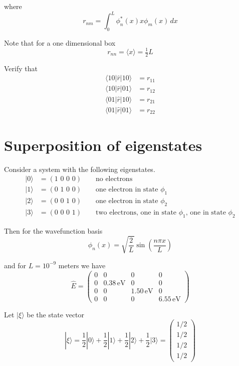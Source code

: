 \documentclass[12pt]{article}
\begin{document}
\noindent
where
\begin{equation*}
r_{nm}=\int_0^L\phi_n^*(x)x\phi_m(x)\,dx
\end{equation*}

\noindent
Note that for a one dimensional box
\begin{equation*}
r_{nn}=\langle x\rangle=\tfrac{1}{2}L
\end{equation*}

\noindent
Verify that
\begin{align*}
\langle10|\hat{r}|10\rangle&=r_{11}\\
\langle10|\hat{r}|01\rangle&=r_{12}\\
\langle01|\hat{r}|10\rangle&=r_{21}\\
\langle01|\hat{r}|01\rangle&=r_{22}
\end{align*}

\newpage

\section{Superposition of eigenstates}
Consider a system with the following eigenstates.
\begin{align*}
|0\rangle&=(\text{1 0 0 0})\qquad\text{no electrons}\\
|1\rangle&=(\text{0 1 0 0})\qquad\text{one electron in state $\phi_1$}\\
|2\rangle&=(\text{0 0 1 0})\qquad\text{one electron in state $\phi_2$}\\
|3\rangle&=(\text{0 0 0 1})\qquad\text{two electrons, one in state $\phi_1$, one in state $\phi_2$}
\end{align*}

\noindent
Then for the wavefunction basis
\begin{equation*}
\phi_n(x)=\sqrt{\frac{2}{L}}\sin\left(\frac{n\pi x}{L}\right)
\end{equation*}

\noindent
and for $L=10^{-9}$ meters we have
\begin{equation*}
\hat{E}=\begin{pmatrix}
0&0&0&0\\
0&0.38\,\text{eV}&0&0\\
0&0&1.50\,\text{eV}&0\\
0&0&0&6.55\,\text{eV}
\end{pmatrix}
\end{equation*}

\noindent
Let $|\xi\rangle$ be the state vector
\begin{equation*}
|\xi\rangle
=\frac{1}{2}|0\rangle+\frac{1}{2}|1\rangle+\frac{1}{2}|2\rangle+\frac{1}{2}|3\rangle
=\begin{pmatrix}1/2\\1/2\\1/2\\1/2\end{pmatrix}
\end{equation*}
\end{document}
